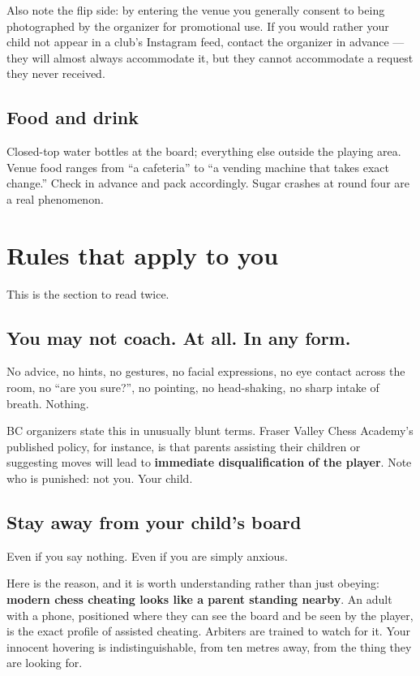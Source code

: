 \documentclass[10pt,letterpaper]{article}
\begin{document}
Also note the flip side: by entering the venue you generally consent to being
photographed by the organizer for promotional use. If you would rather your
child not appear in a club's Instagram feed, contact the organizer in advance ---
they will almost always accommodate it, but they cannot accommodate a request
they never received.

\subsection{Food and drink}

Closed-top water bottles at the board; everything else outside the playing area.
Venue food ranges from ``a cafeteria'' to ``a vending machine that takes
exact change.'' Check in advance and pack accordingly. Sugar crashes at round
four are a real phenomenon.

\section{Rules that apply to you}
\label{sec:parents}

This is the section to read twice.

\subsection{You may not coach. At all. In any form.}

No advice, no hints, no gestures, no facial expressions, no eye contact
across the room, no ``are you sure?'', no pointing, no head-shaking, no
sharp intake of breath. Nothing.

BC organizers state this in unusually blunt terms. Fraser Valley Chess Academy's
published policy, for instance, is that parents assisting their children or
suggesting moves will lead to \textbf{immediate disqualification of the player}.
Note who is punished: not you. Your child.

\subsection{Stay away from your child's board}

Even if you say nothing. Even if you are simply anxious.

Here is the reason, and it is worth understanding rather than just obeying:
\textbf{modern chess cheating looks like a parent standing nearby}. An adult
with a phone, positioned where they can see the board and be seen by the player,
is the exact profile of assisted cheating. Arbiters are trained to watch for it.
Your innocent hovering is indistinguishable, from ten metres away, from the
thing they are looking for.
\end{document}
